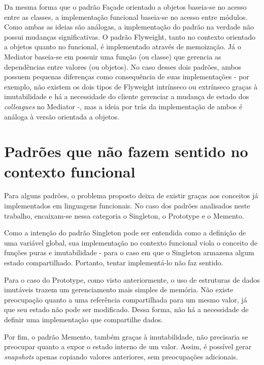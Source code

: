 Da mesma forma que o padrão Façade orientado 
a objetos baseia-se no acesso entre as classes, 
a implementação funcional baseia-se no acesso 
entre módulos. Como ambas as ideias são 
análogas, a implementação do padrão na verdade 
não possui mudanças significativas. 
O padrão Flyweight, tanto no 
contexto orientado a objetos quanto no funcional, 
é implementado através de memoização. Já o Mediator 
baseia-se em possuir uma função (ou classe) que 
gerencia as dependências entre valores (ou objetos). 
No caso desses dois padrões, ambos possuem 
pequenas diferenças como consequência de suas 
implementações - por exemplo, não existem os dois 
tipos de Flyweight intrínseco ou extrínseco 
graças à imutabilidade e há a necessidade do 
cliente gerenciar a mudança de estado dos 
\textit{colleagues} no Mediator -, mas a ideia 
por trás da implementação de ambos é análoga 
à versão orientada a objetos.

\section{Padrões que não fazem sentido no contexto funcional}

Para alguns padrões, o problema proposto deixa 
de existir graças aos conceitos já implementados 
em linguagens funcionais. No caso dos padrões 
analisados neste trabalho, encaixam-se nessa 
categoria o Singleton, o Prototype e o Memento. 

Como a intenção do padrão Singleton pode 
ser entendida como a definição de uma variável 
global, sua implementação no contexto funcional 
viola o conceito de funções puras e imutabilidade - 
para o caso em que o Singleton armazena algum 
estado compartilhado. Portanto, tentar 
implementá-lo não faz sentido. 

Para o caso do Prototype, como visto anteriormente, 
o uso de estruturas de dados imutáveis trazem um 
gerenciamento mais simples de memória. Não existe 
preocupação quanto a uma referência compartilhada 
para um mesmo valor, já que seu estado não pode ser 
modificado. Dessa forma, não há a necessidade de 
definir uma implementação que compartilhe dados.

Por fim, o padrão Memento, também graças à 
imutabilidade, não precisaria se preocupar quanto 
a expor o estado interno de um valor. Assim, é 
possível gerar \textit{snapshots} apenas copiando 
valores anteriores, sem preocupações adicionais. 

